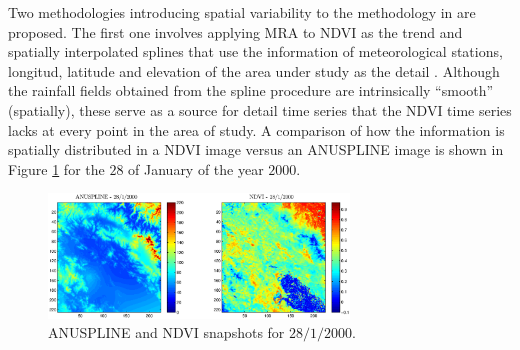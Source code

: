 \documentclass[10pt,letterpaper,conference]{ieeeconf}
\begin{document}
Two methodologies introducing spatial variability to the methodology in  
\cite{Heidinger-et-al_2012,Quiroz-et-al_2011} are proposed. The first 
one involves applying MRA to NDVI as the trend and spatially interpolated 
splines that use the information of meteorological stations, longitud, latitude 
and elevation of the area under study as the detail 
\cite{ANUSP_07,Hutchinson_95,Hutchinson_2006}. Although the rainfall fields 
obtained from the spline procedure are intrinsically ``smooth'' (spatially), 
these serve as a source for detail time series that the NDVI time series 
lacks at every point in the area of study. A comparison of how the information 
is spatially distributed in a NDVI image 
versus an ANUSPLINE image is shown in Figure \ref{fig:NDVI_ANUSLINE} for the 
$28$ of January of the year $2000$.
\begin{figure}[ht]
\begce
\includegraphics[width=8cm]{NDVI_ANUSLINE}
\endce
\caption{ANUSPLINE and NDVI snapshots for $28/1/2000$.}
\label{fig:NDVI_ANUSLINE}
\end{figure}
\end{document}
